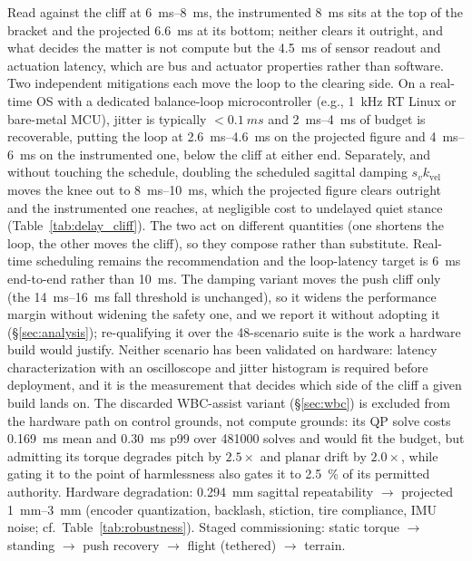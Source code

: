 \documentclass[conference]{IEEEtran}
\begin{document}
Read against the cliff at \SIrange{6}{8}{ms}, the instrumented \SI{8}{ms} sits at the top of the bracket and the projected \SI{6.6}{ms} at its bottom; neither clears it outright, and what decides the matter is not compute but the \SI{4.5}{ms} of sensor readout and actuation latency, which are bus and actuator properties rather than software. Two independent mitigations each move the loop to the clearing side. On a real-time OS with a dedicated balance-loop microcontroller (e.g., \SI{1}{kHz} RT Linux or bare-metal MCU), jitter is typically ${<}\SI{0.1}{ms}$ and \SIrange{2}{4}{ms} of budget is recoverable, putting the loop at \SIrange{2.6}{4.6}{ms} on the projected figure and \SIrange{4}{6}{ms} on the instrumented one, below the cliff at either end. Separately, and without touching the schedule, doubling the scheduled sagittal damping $s_v k_{\text{vel}}$ moves the knee out to \SIrange{8}{10}{ms}, which the projected figure clears outright and the instrumented one reaches, at negligible cost to undelayed quiet stance (Table~\ref{tab:delay_cliff}). The two act on different quantities (one shortens the loop, the other moves the cliff), so they compose rather than substitute. Real-time scheduling remains the recommendation and the loop-latency target is \SI{6}{ms} end-to-end rather than \SI{10}{ms}. The damping variant moves the push cliff only (the \SIrange{14}{16}{ms} fall threshold is unchanged), so it widens the performance margin without widening the safety one, and we report it without adopting it (\S\ref{sec:analysis}); re-qualifying it over the \num{48}-scenario suite is the work a hardware build would justify. Neither scenario has been validated on hardware: latency characterization with an oscilloscope and jitter histogram is required before deployment, and it is the measurement that decides which side of the cliff a given build lands on. The discarded WBC-assist variant (\S\ref{sec:wbc}) is excluded from the hardware path on control grounds, not compute grounds: its QP solve costs \SI{0.169}{ms} mean and \SI{0.30}{ms} p99 over \num{481000} solves and would fit the budget, but admitting its torque degrades pitch by $\num{2.5}\times$ and planar drift by $\num{2.0}\times$, while gating it to the point of harmlessness also gates it to \SI{2.5}{\percent} of its permitted authority. Hardware degradation: \SI{0.294}{mm} sagittal repeatability $\rightarrow$ projected \SIrange{1}{3}{mm} (encoder quantization, backlash, stiction, tire compliance, IMU noise; cf.\ Table~\ref{tab:robustness}). Staged commissioning: static torque $\rightarrow$ standing $\rightarrow$ push recovery $\rightarrow$ flight (tethered) $\rightarrow$ terrain.
\end{document}
